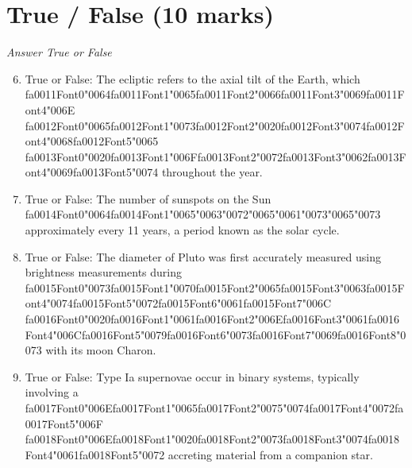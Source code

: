 \documentclass[12pt]{article}
\begin{document}
\section*{True / False (10 marks)}
\textit{Answer True or False}
\begin{enumerate}[label=\arabic*.]
\setcounter{enumi}{5}
\item True or False: The ecliptic refers to the axial tilt of the Earth, which {\csname fa0011Font0\endcsname\char"0064}{\csname fa0011Font1\endcsname\char"0065}{\csname fa0011Font2\endcsname\char"0066}{\csname fa0011Font3\endcsname\char"0069}{\csname fa0011Font4\endcsname\char"006E} {\csname fa0012Font0\endcsname\char"0065}{\csname fa0012Font1\endcsname\char"0073}{\csname fa0012Font2\endcsname\char"0020}{\csname fa0012Font3\endcsname\char"0074}{\csname fa0012Font4\endcsname\char"0068}{\csname fa0012Font5\endcsname\char"0065} {\csname fa0013Font0\endcsname\char"0020}{\csname fa0013Font1\endcsname\char"006F}{\csname fa0013Font2\endcsname\char"0072}{\csname fa0013Font3\endcsname\char"0062}{\csname fa0013Font4\endcsname\char"0069}{\csname fa0013Font5\endcsname\char"0074} throughout the year.
\item True or False: The number of sunspots on the Sun {\csname fa0014Font0\endcsname\char"0064}{\csname fa0014Font1\endcsname\char"0065}{\char"0063}{\char"0072}{\char"0065}{\char"0061}{\char"0073}{\char"0065}{\char"0073} approximately every 11 years, a period known as the solar cycle.
\item True or False: The diameter of Pluto was first accurately measured using brightness measurements during {\csname fa0015Font0\endcsname\char"0073}{\csname fa0015Font1\endcsname\char"0070}{\csname fa0015Font2\endcsname\char"0065}{\csname fa0015Font3\endcsname\char"0063}{\csname fa0015Font4\endcsname\char"0074}{\csname fa0015Font5\endcsname\char"0072}{\csname fa0015Font6\endcsname\char"0061}{\csname fa0015Font7\endcsname\char"006C} {\csname fa0016Font0\endcsname\char"0020}{\csname fa0016Font1\endcsname\char"0061}{\csname fa0016Font2\endcsname\char"006E}{\csname fa0016Font3\endcsname\char"0061}{\csname fa0016Font4\endcsname\char"006C}{\csname fa0016Font5\endcsname\char"0079}{\csname fa0016Font6\endcsname\char"0073}{\csname fa0016Font7\endcsname\char"0069}{\csname fa0016Font8\endcsname\char"0073} with its moon Charon.
\item True or False: Type Ia supernovae occur in binary systems, typically involving a {\csname fa0017Font0\endcsname\char"006E}{\csname fa0017Font1\endcsname\char"0065}{\csname fa0017Font2\endcsname\char"0075}{\char"0074}{\csname fa0017Font4\endcsname\char"0072}{\csname fa0017Font5\endcsname\char"006F} {\csname fa0018Font0\endcsname\char"006E}{\csname fa0018Font1\endcsname\char"0020}{\csname fa0018Font2\endcsname\char"0073}{\csname fa0018Font3\endcsname\char"0074}{\csname fa0018Font4\endcsname\char"0061}{\csname fa0018Font5\endcsname\char"0072} accreting material from a companion star.

\end{enumerate}
\end{document}
